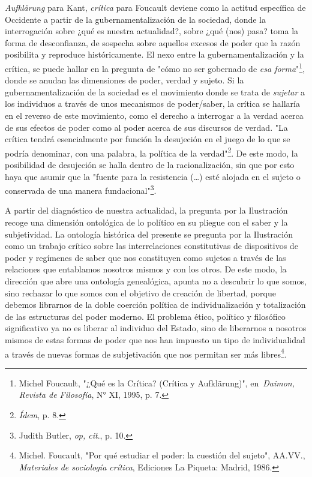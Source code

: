 \documentclass{book}
\begin{document}
\emph{Aufklärung} para Kant, \emph{crítica} para Foucault deviene como
la actitud específica de Occidente a partir de la gubernamentalización
de la sociedad, donde la interrogación sobre ¿qué es nuestra
actualidad?, sobre ¿qué (nos) pasa? toma la forma de desconfianza, de
sospecha sobre aquellos excesos de poder que la razón posibilita y
reproduce históricamente. El nexo entre la gubernamentalización y la
crítica, se puede hallar en la pregunta de "cómo no ser gobernado de
\emph{esa forma}"\footnote{Michel Foucault, "¿Qué es la Crítica?
  (Crítica y Aufklärung)", en~\emph{Daimon, Revista de Filosofía}, N°
  XI, 1995, p. 7.}, donde se anudan las dimensiones de poder, verdad y
sujeto. Si la gubernamentalización de la sociedad es el movimiento donde
se trata de \emph{sujetar} a los individuos a través de unos mecanismos
de poder/saber, la crítica se hallaría en el reverso de este movimiento,
como el derecho a interrogar a la verdad acerca de sus efectos de poder
como al poder acerca de sus discursos de verdad. "La crítica tendrá
esencialmente por función la desujeción en el juego de lo que se podría
denominar, con una palabra, la política de la verdad"\footnote{\emph{Ídem},
  p. 8.}. De este modo, la posibilidad de desujeción se halla dentro de
la racionalización, sin que por esto haya que asumir que la "fuente para
la resistencia (\dots) esté alojada en el sujeto o conservada de
una manera fundacional"\footnote{Judith Butler, \emph{op, cit}., p. 10.}.

A partir del diagnóstico de nuestra actualidad, la pregunta por la
Ilustración recoge una dimensión ontológica de lo político en su pliegue
con el saber y la subjetividad. La ontología histórica del presente se
pregunta por la Ilustración como un trabajo crítico sobre las
interrelaciones constitutivas de dispositivos de poder y regímenes de
saber que nos constituyen como sujetos a través de las relaciones que
entablamos nosotros mismos y con los otros. De este modo, la dirección
que abre una ontología genealógica, apunta no a descubrir lo que somos,
sino rechazar lo que somos con el objetivo de creación de libertad,
porque debemos librarnos de la doble coerción política de
individualización y totalización de las estructuras del poder moderno.
El problema ético, político y filosófico significativo ya no es liberar
al individuo del Estado, sino de liberarnos a nosotros mismos de estas
formas de poder que nos han impuesto un tipo de individualidad a través
de nuevas formas de subjetivación que nos permitan ser más
libres\footnote{Michel. Foucault, "Por qué estudiar el poder: la
  cuestión del sujeto", AA.VV., \emph{Materiales de sociología crítica},
  Ediciones La Piqueta: Madrid, 1986.}.
\end{document}

